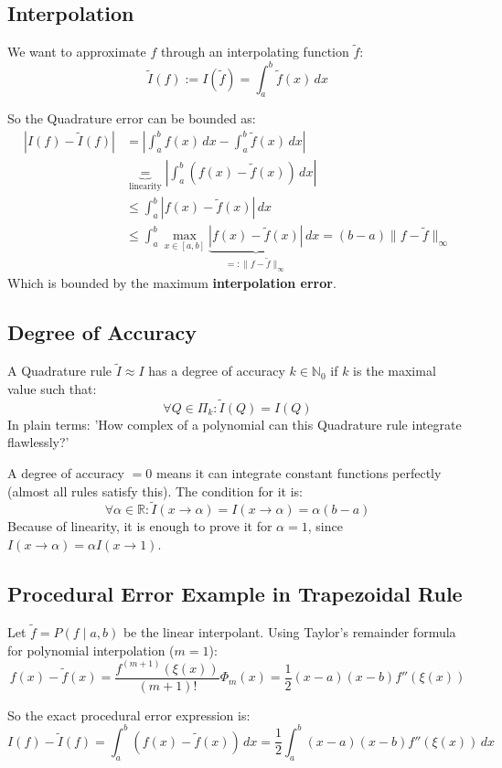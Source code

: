 \documentclass{article}
\begin{document}
\subsection{Interpolation}
We want to approximate $f$ through an interpolating function $\tilde{f}$:
\[\tilde{I}(f) := I(\tilde{f}) = \int_a^b \tilde{f}(x) \, dx\]

So the Quadrature error can be bounded as:
\[
\begin{split}
|I(f) - \tilde{I}(f)| &= \left|\int_a^b f(x) \, dx - \int_a^b \tilde{f}(x) \, dx\right| \\
&\underbrace{=}_{\text{linearity}} \left|\int_a^b (f(x) - \tilde{f}(x)) \, dx\right| \\
&\leq \int_a^b |f(x) - \tilde{f}(x)| \, dx \\
&\leq \int_a^b \max_{x\in [a,b]} \underbrace{|f(x) - \tilde{f}(x)|}_{=: \|f-\tilde{f}\|_\infty} \, dx = (b-a)\|f-\tilde{f}\|_\infty
\end{split}
\]
Which is bounded by the maximum \textbf{interpolation error}.

\subsection{Degree of Accuracy}
A Quadrature rule $\tilde{I} \approx I$ has a degree of accuracy $k \in \mathbb{N}_0$ if $k$ is the maximal value such that:
\[\forall Q \in \Pi_k : \tilde{I}(Q) = I(Q)\]
In plain terms: 'How complex of a polynomial can this Quadrature rule integrate flawlessly?'

A degree of accuracy $= 0$ means it can integrate constant functions perfectly (almost all rules satisfy this). The condition for it is:
\[\forall \alpha \in \mathbb{R}: \tilde{I}(x \to \alpha) = I(x \to \alpha) = \alpha(b-a)\]
Because of linearity, it is enough to prove it for $\alpha = 1$, since $I(x \to \alpha) = \alpha I(x \to 1)$.

\subsection{Procedural Error Example in Trapezoidal Rule}
Let $\tilde{f} = P(f \mid a,b)$ be the linear interpolant. Using Taylor's remainder formula for polynomial interpolation ($m=1$):
\[f(x) - \tilde{f}(x) = \frac{f^{(m+1)}(\xi(x))}{(m+1)!}\Phi_m(x) = \frac{1}{2}(x-a)(x-b)f''(\xi(x))\]

So the exact procedural error expression is:
\[I(f) - \tilde{I}(f) = \int_a^b (f(x) - \tilde{f}(x)) \, dx = \frac{1}{2}\int_a^b (x-a)(x-b)f''(\xi(x)) \, dx\]
\end{document}
